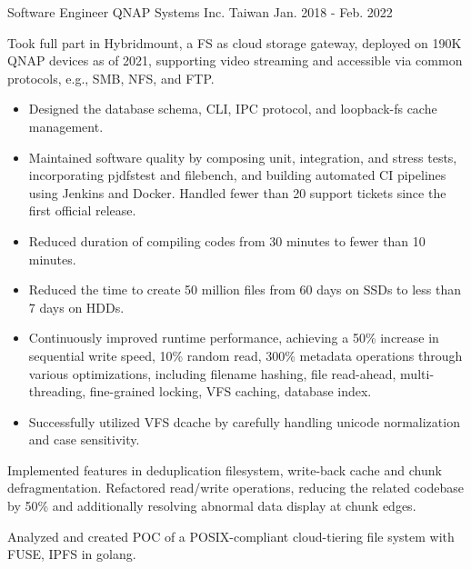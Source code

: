 \begin{cventries}
  \cventry
    {Software Engineer} %
    {QNAP Systems Inc.} %
    {Taiwan} %
    {Jan. 2018 - Feb. 2022} %
    {
      \begin{cvitems} %
        \item Took full part in Hybridmount, a FS as cloud storage gateway,
          deployed on 190K QNAP devices as of 2021, supporting video streaming
          and accessible via common protocols, e.g., SMB, NFS, and FTP.
        \begin{itemize}
          \item Designed the database schema, CLI, IPC protocol, and loopback-fs
            cache management.
          \item Maintained software quality by composing unit, integration, and
            stress tests, incorporating pjdfstest and filebench, and building
            automated CI pipelines using Jenkins and Docker. Handled fewer than
            20 support tickets since the first official release.
          \item Reduced duration of compiling codes from 30 minutes to fewer
            than 10 minutes.
          \item Reduced the time to create 50 million files from 60 days
            on SSDs to less than 7 days on HDDs.
          \item Continuously improved runtime performance, achieving a 50\%
            increase in sequential write speed, 10\% random read, 300\% metadata
            operations through various optimizations, including filename
            hashing, file read-ahead, multi-threading, fine-grained locking, VFS
            caching, database index.
          \item Successfully utilized VFS dcache by carefully handling unicode
            normalization and case sensitivity.
        \end{itemize}
        \item Implemented features in deduplication filesystem, write-back cache
          and chunk defragmentation. Refactored read/write operations, reducing
          the related codebase by 50\% and additionally resolving abnormal data
          display at chunk edges.
        \item Analyzed and created POC of a POSIX-compliant cloud-tiering file
          system with FUSE, IPFS in golang.
      \end{cvitems}
    }

\end{cventries}
